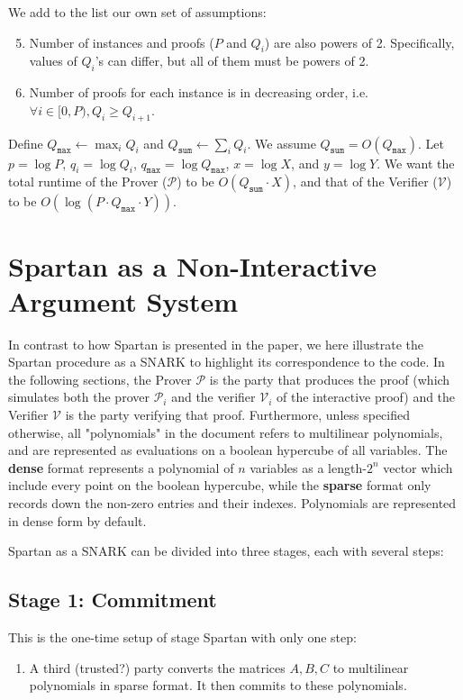 \documentclass{article}
\newcommand{\red}[1] {\color{red}#1\color{black}}
\newcommand{\Qsum}{Q_{\mathtt{sum}}}
\newcommand{\Qmax}{Q_{\mathtt{max}}}
\newcommand{\qmax}{q_{\mathtt{max}}}
\renewcommand{\P}{\mathcal{P}}
\newcommand{\V}{\mathcal{V}}
\begin{document}
\noindent We add to the list our own set of assumptions:
\begin{enumerate}
    \setcounter{enumi}{4}
    \item Number of instances and proofs ($P$ and $Q_i$) are also powers of 2. Specifically, values of $Q_i$'s can differ, but all of them must be powers of 2. \label{ass:p_q_pow2}
    \item Number of proofs for each instance is in decreasing order, i.e. $\forall i\in [0, P), Q_i \geq Q_{i+1}$. \label{ass:q_decreasing}
\end{enumerate}

Define $\Qmax \leftarrow \max_i Q_i$ and $\Qsum \leftarrow \sum_i Q_i$. We assume $\Qsum = O(\Qmax)$. Let $p = \log P$, $q_i = \log Q_i$, $\qmax = \log \Qmax$, $x = \log X$, and $y = \log Y$. We want the total runtime of the Prover ($\P$) to be $O(\Qsum \cdot X)$, and that of the Verifier ($\V$) to be $O(\log(P \cdot \Qmax \cdot Y))$.

\section{Spartan as a Non-Interactive Argument System}\label{spartan}
In contrast to how Spartan is presented in the paper, we here illustrate the Spartan procedure as a SNARK to highlight its correspondence to the code. In the following sections, the Prover $\P$ is the party that produces the proof (which simulates both the prover $\P_i$ and the verifier $\V_i$ of the interactive proof) and the Verifier $\V$ is the party verifying that proof. Furthermore, unless specified otherwise, all "polynomials" in the document refers to multilinear polynomials, and are represented as evaluations on a boolean hypercube of all variables. The \textbf{dense} format represents a polynomial of $n$ variables as a length-$2^n$ vector which include every point on the boolean hypercube, while the \textbf{sparse} format only records down the non-zero entries and their indexes. Polynomials are represented in dense form by default.

Spartan as a SNARK can be divided into three stages, each with several steps:
\subsection{Stage 1: Commitment}
This is the one-time setup of stage Spartan with only one step:
\begin{enumerate}
    \item A third (\red{trusted?}) party converts the matrices $A, B, C$ to multilinear polynomials in sparse format. It then commits to these polynomials.
\end{enumerate}
\end{document}
